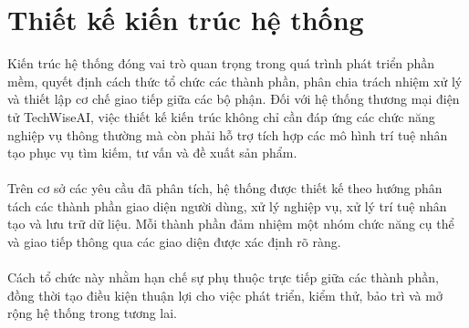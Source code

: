 \documentclass{report}
\begin{document}
\section{Thiết kế kiến trúc hệ thống}
Kiến trúc hệ thống đóng vai trò quan trọng trong quá trình
phát triển phần mềm, quyết định cách thức tổ chức các thành
phần, phân chia trách nhiệm xử lý và thiết lập cơ chế giao
tiếp giữa các bộ phận. Đối với hệ thống thương mại điện tử
TechWiseAI, việc thiết kế kiến trúc không chỉ cần đáp ứng
các chức năng nghiệp vụ thông thường mà còn phải hỗ trợ
tích hợp các mô hình trí tuệ nhân tạo phục vụ tìm kiếm,
tư vấn và đề xuất sản phẩm.\\\\
Trên cơ sở các yêu cầu đã phân tích, hệ thống được thiết
kế theo hướng phân tách các thành phần giao diện người dùng,
xử lý nghiệp vụ, xử lý trí tuệ nhân tạo và lưu trữ dữ liệu.
Mỗi thành phần đảm nhiệm một nhóm chức năng cụ thể và
giao tiếp thông qua các giao diện được xác định rõ ràng.\\\\
Cách tổ chức này nhằm hạn chế sự phụ thuộc trực tiếp giữa
các thành phần, đồng thời tạo điều kiện thuận lợi cho việc
phát triển, kiểm thử, bảo trì và mở rộng hệ thống trong
tương lai.
\end{document}
